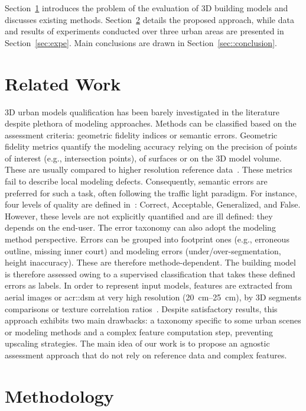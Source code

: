 \documentclass[conference]{IEEEtran}
\begin{document}
Section~\ref{sec:related} introduces the problem of the evaluation of 3D building models and discusses existing methods. Section~\ref{sec:approach} details the proposed approach, while data and results of experiments conducted over three urban areas are presented in Section~\ref{sec:expe}. Main conclusions are drawn in Section~\ref{sec::conclusion}.

\section{Related Work}
\label{sec:related}
	3D urban models qualification has been barely investigated in the literature despite plethora of modeling approaches. Methods can be classified based on the assessment criteria: geometric fidelity indices or semantic errors. Geometric fidelity metrics quantify the modeling accuracy relying on the precision of points of interest (e.g., intersection points), of surfaces or on the 3D model volume. These are usually compared to higher resolution reference data~\cite{Kaartinen2005,Zeng2014}. These metrics fail to describe local modeling defects. Consequently, semantic errors are preferred for such a task, often following the traffic light paradigm. For instance, four levels of quality are defined in~\cite{boudet2006supervised}: Correct, Acceptable, Generalized, and False. However, these levels are not explicitly quantified and are ill defined: they depends on the end-user. The error taxonomy can also adopt the modeling method perspective. Errors can be grouped into footprint ones (e.g., erroneous outline, missing inner court) and modeling errors (under/over-segmentation, height inaccuracy). These are therefore methode-dependent. The building model is therefore assessed owing to a supervised classification that takes these defined errors as labels. In order to represent input models, features are extracted from aerial images or \acrfull{acr::dsm} at very high resolution (\SIrange{20}{25}{\cm}), by 3D segments comparisons or texture correlation ratios~\cite{Michelin2013,boudet2006supervised}. Despite satisfactory results, this approach exhibits two main drawbacks: a taxonomy specific to some urban scenes or modeling methods and a complex feature computation step, preventing upscaling strategies. The main idea of our work is to propose an agnostic assessment approach that do not rely on reference data and complex features.

\section{Methodology}
\label{sec:approach}
\end{document}
